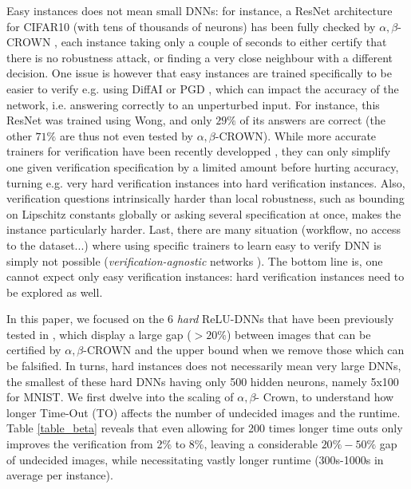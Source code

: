 Easy instances does not mean small DNNs: for instance, a ResNet architecture for CIFAR10 (with tens of thousands of neurons) has been fully checked by $\alpha,\beta$-CROWN \cite{crown}, each instance taking only a couple of seconds to either certify that there is no robustness attack, or finding a very close neighbour with a different decision. One issue is however that easy instances are trained specifically to be easier to verify
e.g. using DiffAI \cite{DiffAI} or PGD \cite{PGD}, which can impact the accuracy of the network, i.e. answering correctly to an unperturbed input. For instance, this ResNet was trained using Wong, and only $29\%$ of its answers are correct (the other $71\%$ are thus not even tested by $\alpha,\beta$-CROWN). While more accurate trainers for verification have been recently developped \cite{TrainingforVerification}, they can only simplify one given verification specification by a limited amount before hurting accuracy, turning e.g. very hard verification instances into hard verification instances.
Also, verification questions intrinsically harder than local robustness, such as 
bounding on Lipschitz constants \cite{lipshitz} globally or asking several specification at once, makes the instance particularly harder. Last, there are many situation (workflow, no access to the dataset...) where using specific trainers to learn easy to verify DNN is simply not possible ({\em verification-agnostic} networks \cite{SDPFI}). The bottom line is, one cannot expect only easy verification instances: hard verification instances need to be explored as well.


In this paper, we focused on the 6 {\em hard} ReLU-DNNs that have been previously tested in \cite{crown}, which display a large gap ($>20\%$) between images that can be certified 
by $\alpha,\beta$-CROWN and the upper bound when we remove those which can be falsified. In turns, hard instances does not necessarily mean very large DNNs, the smallest of these hard DNNs having only 500 hidden neurons, namely 5x100 for MNIST. We first dwelve into the scaling of $\alpha,\beta$- Crown, to understand how longer Time-Out (TO) affects the number of undecided images and the runtime. Table \ref{table_beta} reveals that even allowing for 200 times longer time outs only improves the verification from 2\% to 8\%, leaving a considerable $20\%-50\%$ gap of undecided images, while necessitating vastly longer runtime (300s-1000s in average per instance).


